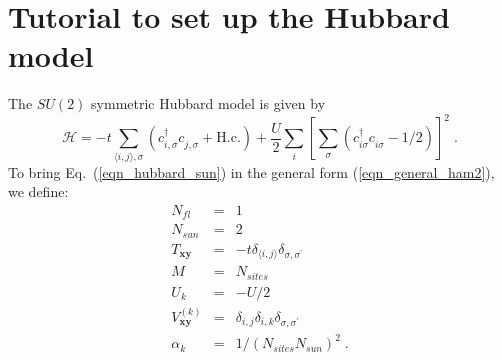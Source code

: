 \section{Tutorial to set up the Hubbard model}
The $SU(2)$ symmetric Hubbard model is given by
\begin{equation}
\label{eqn_hubbard_sun}
\mathcal{H}=
-t\sum\limits_{\langle i,j\rangle,\sigma} 
\left(c^{\dagger}_{i,\sigma} c^{\phantom\dagger}_{j,\sigma} + \text{H.c.}
\right)
+ \frac{U}{2}\sum\limits_{i}\left[
\sum\limits_{\sigma}
\left(  c^{\dagger}_{i\sigma} c^{\phantom\dagger}_{i\sigma}  -1/2 \right) \right]^{2}\;.
\end{equation}
To bring Eq.~(\ref{eqn_hubbard_sun}) in the general form (\ref{eqn_general_ham2}), we define:
\begin{eqnarray}
N_{fl}&=&1\nonumber\\
N_{sun}&=&2\nonumber\\
T_{\bm{x}\bm{y}}&=&-t\delta_{\langle i,j\rangle}\delta_{\sigma,\sigma^{\prime}}\nonumber\\
M&=&N_{sites}\nonumber\\
U_{k}&=&-U/2\nonumber\\
V_{\bm{x}\bm{y}}^{(k)}&=&\delta_{i,j}\delta_{i,k}\delta_{\sigma,\sigma^{\prime}}\nonumber\\
\alpha_{k}&=&1/(N_{sites}N_{sun})^{2}\;.
\end{eqnarray}